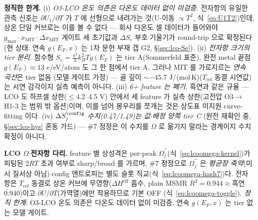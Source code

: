 \begin{warnbox}
\textbf{정직한 한계.} (i) \emph{O3-LCO 온도 의존은 다온도 데이터 없이 미검증.} 전자항의 유일한 관측 신호는
$\partial U_1/\partial T$ 가 $T$ 에 선형으로 내려가는 것(U-이동 $\propto T^2$, 식~\eqref{eq:U1T2})인데, 상온 단일
커브로는 이를 볼 수 없다 --- 회사 다온도 셀 데이터가 들어와야 $g_{\max}\cdot x_\mathrm{MIT}\cdot\Delta x_\mathrm{MIT}$
게이트 세 초기값과 $\Delta S_e$ 부호$\cdot$기울기가 round-trip 으로 확정된다(현 상태: 연속 $g(E_F,x)$ 는 1차
문헌 부재 갭 G2, \S\ref{sec:lco-Se}). (ii) \emph{전자항 크기의 tier 분리.} 함수형
$S_e{=}\tfrac{\pi^2}{3}k_B^2Tg(E_F)$ 는 tier A(Sommerfeld 표준), 완전 metal 끝점 $g(E_F)\!\approx\!13$
e/eV/atom 도 그 한 점에서 tier A\cite{motohashi2009}, 그러나 MIT 를 가로지르는 \emph{연속 곡선}은 tier 없음
(모델 게이트 가정) --- 골 깊이 $\sim-45.7$ J/(mol\,K)($T_\mathrm{ref}$ 동결 시연값)는 시연 감각이지 실측 예측이
아니다. (iii) \emph{6+ feature 는 폐기.} 흑연과 같은 규율 --- LCO 도 하프셀 상한($\le$4.2--4.5 V) 안에서 세
feature 가 실측 상한(고전압 O3$\to$H1-3 는 범위 밖 옵션)이며, 이를 넘어 봉우리를 쪼개는 것은 상도표 미지원
curve-fitting 이다. (iv) \emph{$\Delta S_j^\config$ 수치(0.47/1.49)는 값$\cdot$배정 양쪽 tier C} (원전 재확인
중, \S\ref{sec:lco-hys} 혼동 가드) --- \#7 정정은 이 수치를 $\Omega$ 로 옮기지 말라는 경계이지 수치 확정이 아니다.
\end{warnbox}

\begin{keybox}
\textbf{LCO $\Omega$$\cdot$전자항 다리.} feature 별 상성격은 per-peak $\Omega_j^\cat$(식~\eqref{eq:lcoomega-kernel})가
피팅된 $2RT$ 초과 여부로 sharp/broad 를 가르며, \#7 정정으로 $\Omega_j^\cat$ 은 \emph{평균장 축약}(미시 질서상
아님)$\cdot$config 엔트로피는 별도 슬롯 직교(식~\eqref{eq:lcoomega-hash7})다. 전자항은 $T_\mathrm{ref}$ 동결로
상온 커브에 무영향($\Delta H^\mathrm{eff}$ 흡수, plain MSMR $R^2{=}0.944\!\approx\!$흑연 $0.940$)이고
$\partial U/\partial T$(가역열)에만 작용하므로  기본 OFF
(식~\eqref{eq:lcoomega-toggle}). \emph{정직 한계}: O3-LCO 온도 의존은 다온도 데이터 없이 미검증, 연속
$g(E_F,x)$ 는 tier 없는 모델 게이트.
\end{keybox}

